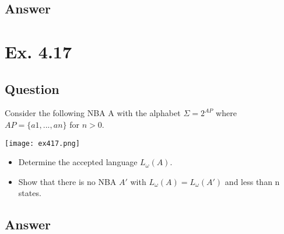 \documentclass[12pt]{article}
\begin{document}
\subsection*{Answer}

\newpage

\section*{Ex. 4.17}
\subsection*{Question}
Consider the following NBA A with the alphabet $\Sigma = 2^{AP}$ where $AP =
\{ a1, . . . , an \}$ for $n > 0$.\\
\begin{centering}
	\texttt{[image: ex417.png]}
\end{centering}
\begin{itemize}
	\item Determine the accepted language $L_\omega(A)$.
	\item Show that there is no NBA $A'$ with $L_\omega(A) = L_\omega(A')$ and less than n states.
\end{itemize}
\subsection*{Answer}
\end{document}

